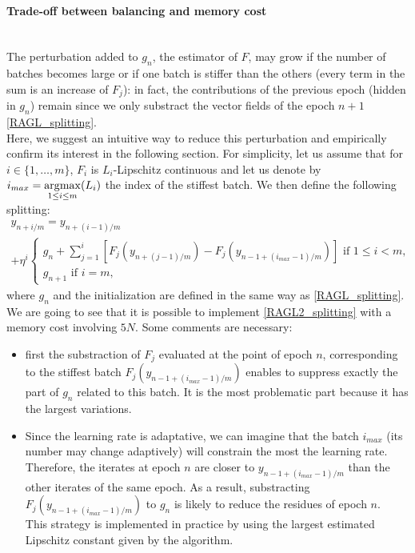\paragraph{Trade-off between balancing and memory cost}
~~\\
The perturbation added to $g_n$, the estimator of $F$, may grow if the number of batches becomes large or if one batch is stiffer than the others (every term in the sum is an increase of $F_j$): in fact, the contributions of the previous epoch (hidden in $g_n$) remain since we only substract the vector fields of the epoch $n+1$ \eqref{RAGL_splitting}. \\ 
Here, we suggest an intuitive way to reduce this perturbation and empirically confirm its interest in the following section. For simplicity, let us assume that for $i\in \{1,\dots,m\}$, $F_i$ is $L_i$-Lipschitz continuous and let us denote by $i_{max} = \displaystyle{\operatorname*{\arg\!\max}_{1 \leq i \leq m}} (L_i)$ the index of the stiffest batch. We then define the following splitting:
\begin{multline}
	y_{n+i/m} = y_{n+(i-1)/m} \\
	+\eta^i
	\left\{
	\begin{array}{ll}
		g_n+\displaystyle{\sum_{j=1}^i} \left[F_j\left(y_{n+(j-1)/m}\right)-F_j\left(y_{n-1+(i_{max}-1)/m}\right)\right] \text{ if } 1\leq i<m,\\
		g_{n+1} \text{ if } i=m,
	\end{array}
	\right.
	\label{RAGL2_splitting}
\end{multline}
where $g_n$ and the initialization are defined in the same way as \eqref{RAGL_splitting}. We are going to see that it is possible to implement \eqref{RAGL2_splitting} with a memory cost involving $5N$.
Some comments are necessary:
\begin{itemize}
	\item first the substraction of $F_j$ evaluated at the point of epoch $n$, corresponding to the stiffest batch $F_j\left(y_{n-1+(i_{max}-1)/m}\right)$ enables to suppress exactly the part of $g_n$ related to this batch. It is the most problematic part because it has the largest variations.
        \item Since the learning rate is adaptative, we can imagine that the batch $i_{max}$ (its number may change adaptively) will constrain the most the learning rate. Therefore, the
          iterates at epoch $n$ are closer to $y_{n-1+(i_{max}-1)/m}$ than the other iterates of the same epoch. As a result, substracting $F_j\left(y_{n-1+(i_{max}-1)/m}\right)$ to $g_n$ is likely to reduce the residues of epoch $n$. \\
{This strategy is implemented in practice by using the largest estimated Lipschitz constant given by the algorithm.}
\end{itemize} 



